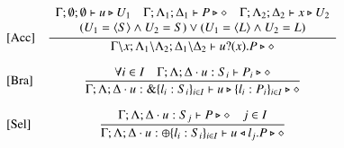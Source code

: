 \begin{figure}[t]
\[\begin{array}{lc}

		\trule{Acc}& \tree{
			\begin{array}{c}
			\Gamma; \emptyset; \emptyset \proves u \hastype 
U_1 
		\quad
		\Gamma; \Lambda_1; \Delta_1 \proves P \hastype \Proc
		\quad
		\Gamma; \Lambda_2; \Delta_2 \proves x \hastype U_2\\
				(U_1 = \chtype{S} 
                                \land %
                                U_2 = S)
				\lor
				 (U_1 = \chtype{L} 
                                \land %
                                 U_2 = L)
               \end{array}
		}{
			\Gamma\backslash x; \Lambda_1 \backslash \Lambda_2; \Delta_1 \backslash \Delta_2 \proves \binp{u}{x} P \hastype \Proc
		}
		\\[6mm]



		\trule{Bra}& \tree{
			 \forall i \in I \quad \Gamma; \Lambda; \Delta \cat u:S_i \proves P_i \hastype \Proc
		}{
			\Gamma; \Lambda; \Delta \cat u: \btbra{l_i:S_i}_{i \in I} \proves \bbra{u}{l_i:P_i}_{i \in I}\hastype \Proc
		}
\\[6mm]
	 	\trule{Sel}& \tree{
			\Gamma; \Lambda; \Delta \cat u: S_j  \proves P \hastype \Proc \quad j \in I

		}{
			\Gamma; \Lambda; \Delta \cat u:\btsel{l_i:S_i}_{i \in I} \proves \bsel{u}{l_j} P \hastype \Proc
		}
		\\[6mm]


\end{array}\]
\end{figure}
